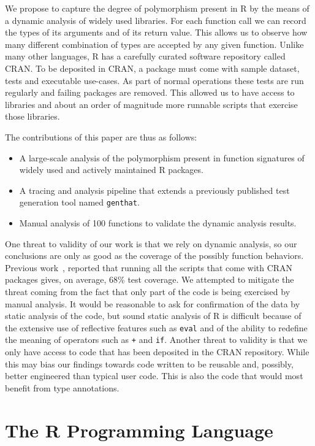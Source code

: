 \documentclass[acmsmall,10pt,review,anonymous]{acmart}\settopmatter{printfolios=true,printccs=false,printacmref=false}
\newcommand{\code}[1]{\lstinline|#1|\xspace}
\begin{document}
We propose to capture the degree of polymorphism present in R by the means
of a dynamic analysis of widely used libraries. For each function call we
can record the types of its arguments and of its return value. This allows
us to observe how many different combination of types are accepted by any
given function. Unlike many other languages, R has a carefully curated
software repository called CRAN. To be deposited in CRAN, a package must
come with sample dataset, tests and executable use-cases. As part of normal
operations these tests are run regularly and failing packages are removed.
This allowed us to have access to \PACKAGES libraries and about an order of
magnitude more runnable scripts that exercise those libraries.

The contributions of this paper are thus as follows:
\begin{itemize}
\item A large-scale analysis of the polymorphism present in function
  signatures of \PACKAGES widely used and actively maintained R packages.
\item A tracing and analysis pipeline that extends a previously published
  test generation tool named \code{genthat}.
\item Manual analysis of 100 functions to validate the dynamic analysis
  results.
\end{itemize}

One threat to validity of our work is that we rely on dynamic analysis, so
our conclusions are only as good as the coverage of the possibly function
behaviors. Previous work~\cite{issta18}, reported that running all the
scripts that come with CRAN packages gives, on average, 68\% test coverage.
We attempted to mitigate the threat coming from the fact that only part of
the code is being exercised by manual analysis. It would be reasonable to
ask for confirmation of the data by static analysis of the code, but sound
static analysis of R is difficult because of the extensive use of reflective
features such as \code{eval} and of the ability to redefine the meaning of
operators such as \code{+} and \code{if}.  Another threat to validity is
that we only have access to code that has been deposited in the CRAN
repository. While this may bias our findings towards code written to be
reusable and, possibly, better engineered than typical user code. This is
also the code that would most benefit from type annotations.

\section{The R Programming Language}\label{sec:rlang}
\end{document}
